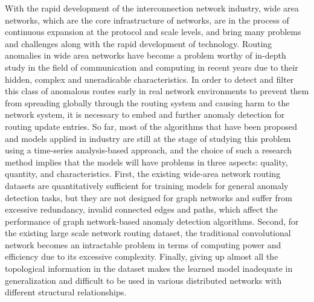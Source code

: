 
\begin{englishabstract}
    With the rapid development of the interconnection network industry, wide area networks, which are the core infrastructure of networks, are in the process of continuous expansion at the protocol and scale levels, and bring many problems and challenges along with the rapid development of technology. Routing anomalies in wide area networks have become a problem worthy of in-depth study in the field of communication and computing in recent years due to their hidden, complex and uneradicable characteristics. In order to detect and filter this class of anomalous routes early in real network environments to prevent them from spreading globally through the routing system and causing harm to the network system, it is necessary to embed and further anomaly detection for routing update entries. So far, most of the algorithms that have been proposed and models applied in industry are still at the stage of studying this problem using a time-series analysis-based approach, and the choice of such a research method implies that the models will have problems in three aspects: quality, quantity, and characteristics. First, the existing wide-area network routing datasets are quantitatively sufficient for training models for general anomaly detection tasks, but they are not designed for graph networks and suffer from excessive redundancy, invalid connected edges and paths, which affect the performance of graph network-based anomaly detection algorithms. Second, for the existing large scale network routing dataset, the traditional convolutional network becomes an intractable problem in terms of computing power and efficiency due to its excessive complexity. Finally, giving up almost all the topological information in the dataset makes the learned model inadequate in generalization and difficult to be used in various distributed networks with different structural relationships.


\end{englishabstract}

